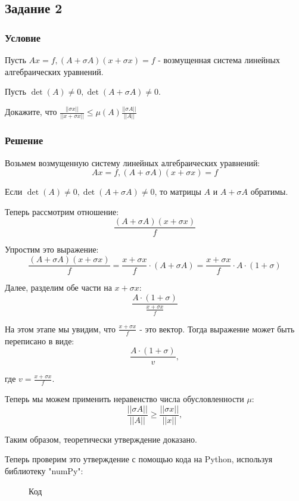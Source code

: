 \subsection{Задание 2}
\subsubsection{Условие}
Пусть \(Ax=f, (A+\sigma A)(x+\sigma x)=f\) - возмущенная система линейных алгебраических уравнений.

Пусть \(\det{(A)} \neq 0, \det{(A+\sigma A)} \neq 0\).

Докажите, что \(\frac{||\sigma x||}{||x + \sigma x||} \leq \mu (A) \frac{||\sigma A||}{||A||}\)
\subsubsection{Решение}
Возьмем возмущенную систему линейных алгебраических уравнений:
\[Ax=f, (A+\sigma A)(x+\sigma x)=f\]

Если \(\det{(A)} \neq 0, \det{(A+\sigma A)} \neq 0\), то матрицы \(A\) и \(A + \sigma A\) обратимы.

Теперь рассмотрим отношение:
\[\frac{(A + \sigma A)(x + \sigma x)}{f}\]

Упростим это выражение:
\[\frac{(A + \sigma A)(x + \sigma x)}{f} = \frac{x + \sigma x}{f} \cdot (A + \sigma A) = \frac{x + \sigma x}{f} \cdot A \cdot (1 + \sigma)\]

Далее, разделим обе части на \(x + \sigma x\):
\[\frac{A \cdot (1 + \sigma)}{\frac{x + \sigma x}{f}}\]

На этом этапе мы увидим, что \(\frac{x + \sigma x}{f}\) - это вектор. Тогда выражение может быть переписано в виде:
\[\frac{A \cdot (1 + \sigma)}{v},\]

где \(v = \frac{x + \sigma x}{f}\).

Теперь мы можем применить неравенство числа обусловленности \(\mu\):
\[\frac{||\sigma A||}{||A||} \geq \frac{||\sigma x||}{||x||},\]

Таким образом, теоретически утверждение доказано.

Теперь проверим это утверждение с помощью кода на Python, используя библиотеку "numPy": 

\begin{figure}[H]
  
  \caption*{Код}
\end{figure}

